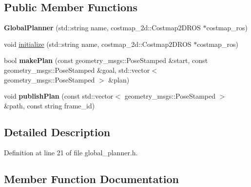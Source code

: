 \subsection*{Public Member Functions}
\begin{DoxyCompactItemize}
\item 
\mbox{\label{classgr__cutting__global__planner_1_1GlobalPlanner_a7a3adcfe1169d597066e4e9c796c1d2b}} 
{\bfseries Global\+Planner} (std\+::string name, costmap\+\_\+2d\+::\+Costmap2\+D\+R\+OS $\ast$costmap\+\_\+ros)
\item 
void \hyperlink{classgr__cutting__global__planner_1_1GlobalPlanner_af25c7f31b7b75f49b3a7b2c44cf86c47}{initialize} (std\+::string name, costmap\+\_\+2d\+::\+Costmap2\+D\+R\+OS $\ast$costmap\+\_\+ros)
\item 
\mbox{\label{classgr__cutting__global__planner_1_1GlobalPlanner_a919c1fee9e8a8b8adba3b5b2aaf3fd25}} 
bool {\bfseries make\+Plan} (const geometry\+\_\+msgs\+::\+Pose\+Stamped \&start, const geometry\+\_\+msgs\+::\+Pose\+Stamped \&goal, std\+::vector$<$ geometry\+\_\+msgs\+::\+Pose\+Stamped $>$ \&plan)
\item 
\mbox{\label{classgr__cutting__global__planner_1_1GlobalPlanner_a8cc0d1ce5cfe14da87fec733ae2875a6}} 
void {\bfseries publish\+Plan} (const std\+::vector$<$ geometry\+\_\+msgs\+::\+Pose\+Stamped $>$ \&path, const string frame\+\_\+id)
\end{DoxyCompactItemize}


\subsection{Detailed Description}


Definition at line 21 of file global\+\_\+planner.\+h.



\subsection{Member Function Documentation}
\mbox{\label{classgr__cutting__global__planner_1_1GlobalPlanner_af25c7f31b7b75f49b3a7b2c44cf86c47}} 
